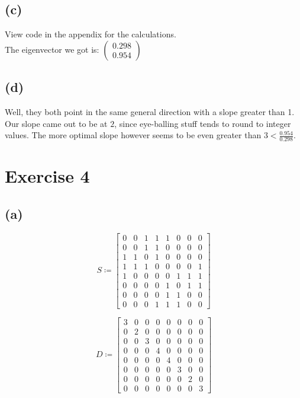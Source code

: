 \documentclass[12pt]{article}
\begin{document}
\subsection*{(c)}
View code in the appendix for the calculations. \\
The eigenvector we got is: $\left( \begin{array}{c} 0.298 \\ 0.954 \end{array}\right)$

\subsection*{(d)}
Well, they both point in the same general direction with a slope greater than 1. Our slope came out to be at $2$, since eye-balling stuff tends to round to integer values. The more optimal slope however seems to be even greater than $3 < \frac{0.954}{0.298}$.

\section*{Exercise 4}
\subsection*{(a)}
\begin{equation*}
	S \coloneqq \left[
	\begin{array}{cccccccc}
		0 & 0 & 1 & 1 & 1 & 0 & 0 & 0 \\
		0 & 0 & 1 & 1 & 0 & 0 & 0 & 0 \\
		1 & 1 & 0 & 1 & 0 & 0 & 0 & 0 \\
		1 & 1 & 1 & 0 & 0 & 0 & 0 & 1 \\
		1 & 0 & 0 & 0 & 0 & 1 & 1 & 1 \\
		0 & 0 & 0 & 0 & 1 & 0 & 1 & 1 \\
		0 & 0 & 0 & 0 & 1 & 1 & 0 & 0 \\
		0 & 0 & 0 & 1 & 1 & 1 & 0 & 0
	\end{array} \right]
\end{equation*}

\begin{equation*}
	D \coloneqq \left[
	\begin{array}{cccccccc}
		3 & 0 & 0 & 0 & 0 & 0 & 0 & 0 \\
		0 & 2 & 0 & 0 & 0 & 0 & 0 & 0 \\
		0 & 0 & 3 & 0 & 0 & 0 & 0 & 0 \\
		0 & 0 & 0 & 4 & 0 & 0 & 0 & 0 \\
		0 & 0 & 0 & 0 & 4 & 0 & 0 & 0 \\
		0 & 0 & 0 & 0 & 0 & 3 & 0 & 0 \\
		0 & 0 & 0 & 0 & 0 & 0 & 2 & 0 \\
		0 & 0 & 0 & 0 & 0 & 0 & 0 & 3
	\end{array} \right]
\end{equation*}
\end{document}
